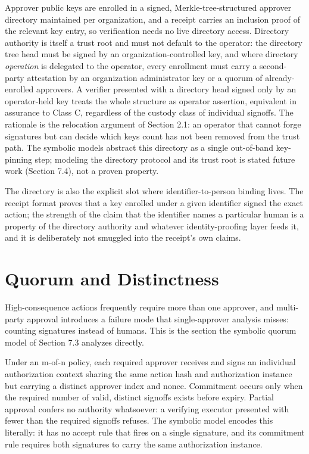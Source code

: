 \documentclass[11pt]{article}
\begin{document}
Approver public keys are enrolled in a signed, Merkle-tree-structured approver
directory maintained per organization, and a receipt carries an inclusion proof of
the relevant key entry, so verification needs no live directory access. Directory
authority is itself a trust root and must not default to the operator: the
directory tree head must be signed by an organization-controlled key, and where
directory \emph{operation} is delegated to the operator, every enrollment must
carry a second-party attestation by an organization administrator key or a quorum
of already-enrolled approvers. A verifier presented with a directory head signed
only by an operator-held key treats the whole structure as operator assertion,
equivalent in assurance to Class C, regardless of the custody class of individual
signoffs. The rationale is the relocation argument of Section 2.1: an operator
that cannot forge signatures but can decide which keys count has not been removed
from the trust path. The symbolic models abstract this directory as a single
out-of-band key-pinning step; modeling the directory protocol and its trust root
is stated future work (Section 7.4), not a proven property.

The directory is also the explicit slot where identifier-to-person binding lives.
The receipt format proves that a key enrolled under a given identifier signed the
exact action; the strength of the claim that the identifier names a particular
human is a property of the directory authority and whatever identity-proofing
layer feeds it, and it is deliberately not smuggled into the receipt's own claims.

\section{Quorum and Distinctness}

High-consequence actions frequently require more than one approver, and
multi-party approval introduces a failure mode that single-approver analysis
misses: counting signatures instead of humans. This is the section the symbolic
quorum model of Section 7.3 analyzes directly.

Under an m-of-n policy, each required approver receives and signs an individual
authorization context sharing the same action hash and authorization instance but
carrying a distinct approver index and nonce. Commitment occurs only when the required number of valid,
distinct signoffs exists before expiry. Partial approval confers no authority
whatsoever: a verifying executor presented with fewer than the required signoffs
refuses. The symbolic model encodes this literally: it has no accept rule that
fires on a single signature, and its commitment rule requires both signatures to
carry the same authorization instance.
\end{document}
